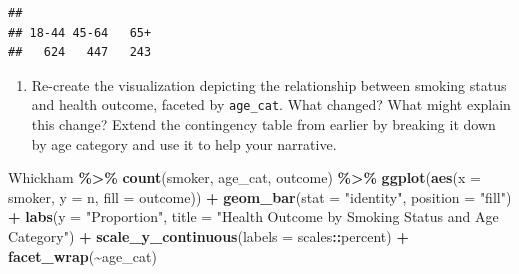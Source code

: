 \documentclass[
]{article}
\newenvironment{Shaded}{\begin{snugshade}}{\end{snugshade}}
\newcommand{\AttributeTok}[1]{\textcolor[rgb]{0.13,0.29,0.53}{#1}}
\newcommand{\DecValTok}[1]{\textcolor[rgb]{0.00,0.00,0.81}{#1}}
\newcommand{\FunctionTok}[1]{\textcolor[rgb]{0.13,0.29,0.53}{\textbf{#1}}}
\newcommand{\NormalTok}[1]{#1}
\newcommand{\OtherTok}[1]{\textcolor[rgb]{0.56,0.35,0.01}{#1}}
\newcommand{\SpecialCharTok}[1]{\textcolor[rgb]{0.81,0.36,0.00}{\textbf{#1}}}
\newcommand{\StringTok}[1]{\textcolor[rgb]{0.31,0.60,0.02}{#1}}
\providecommand{\tightlist}{%
  \setlength{\itemsep}{0pt}\setlength{\parskip}{0pt}}
\begin{document}
\begin{Shaded}
\end{Shaded}

\begin{verbatim}
## 
## 18-44 45-64   65+ 
##   624   447   243
\end{verbatim}

\begin{enumerate}
\def\labelenumi{\arabic{enumi}.}
\setcounter{enumi}{6}
\tightlist
\item
  Re-create the visualization depicting the relationship between smoking
  status and health outcome, faceted by \texttt{age\_cat}. What changed?
  What might explain this change? Extend the contingency table from
  earlier by breaking it down by age category and use it to help your
  narrative.
\end{enumerate}

\begin{Shaded}
\begin{Highlighting}[]
\NormalTok{Whickham }\SpecialCharTok{\%\textgreater{}\%}
  \FunctionTok{count}\NormalTok{(smoker, age\_cat, outcome) }\SpecialCharTok{\%\textgreater{}\%}
  \FunctionTok{ggplot}\NormalTok{(}\FunctionTok{aes}\NormalTok{(}\AttributeTok{x =}\NormalTok{ smoker, }\AttributeTok{y =}\NormalTok{ n, }\AttributeTok{fill =}\NormalTok{ outcome)) }\SpecialCharTok{+}
  \FunctionTok{geom\_bar}\NormalTok{(}\AttributeTok{stat =} \StringTok{"identity"}\NormalTok{, }\AttributeTok{position =} \StringTok{"fill"}\NormalTok{) }\SpecialCharTok{+}
  \FunctionTok{labs}\NormalTok{(}\AttributeTok{y =} \StringTok{"Proportion"}\NormalTok{, }\AttributeTok{title =} \StringTok{"Health Outcome by Smoking Status and Age Category"}\NormalTok{) }\SpecialCharTok{+}
  \FunctionTok{scale\_y\_continuous}\NormalTok{(}\AttributeTok{labels =}\NormalTok{ scales}\SpecialCharTok{::}\NormalTok{percent) }\SpecialCharTok{+}
  \FunctionTok{facet\_wrap}\NormalTok{(}\SpecialCharTok{\textasciitilde{}}\NormalTok{age\_cat)}
\end{Highlighting}
\end{Shaded}
\end{document}
